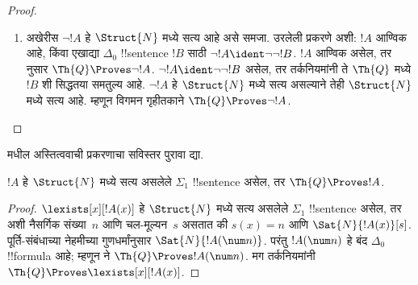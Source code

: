 \documentclass[../../../include/open-logic-section]{subfiles}
\begin{document}
\begin{proof}
\begin{enumerate}
$\lnot \bexists{x<t}{!A(x)}$ हे
$\Struct{N}$ मध्ये सत्य आहे असे समजा.
हे !!{sentence} $\Th{Q}$ मध्ये
$\bforall{x<t}{\lnot!A(x)}$ शी समतुल्य
आहे; म्हणून परिबद्ध वैश्विक संख्यापकाचा
युक्तिवाद लागू करता येतो.
%
\item अखेरीस $\lnot !A$ हे
$\Struct{N}$ मध्ये सत्य आहे असे समजा.
उरलेली प्रकरणे अशी: $!A$ आण्विक आहे,
किंवा एखाद्या $\Delta_0$ !!{sentence} $!B$
साठी $\lnot !A \ident \lnot\lnot !B$.
$!A$ आण्विक असेल, तर
 नुसार
$\Th{Q} \Proves \lnot !A$.
$\lnot !A \ident \lnot\lnot !B$ असेल,
तर तर्कनियमांनी ते $\Th{Q}$ मध्ये
$!B$ शी सिद्धतया समतुल्य आहे.
$\lnot !A$ हे $\Struct{N}$ मध्ये सत्य
असल्याने तेही $\Struct{N}$ मध्ये सत्य आहे.
म्हणून विगमन गृहीतकाने
$\Th{Q} \Proves \lnot !A$.
\end{enumerate}
\end{proof}

\begin{prob}
 मधील
अस्तित्ववाची प्रकरणाचा सविस्तर पुरावा द्या.
\end{prob}

\begin{thm}
$!A$ हे $\Struct{N}$ मध्ये सत्य असलेले
$\Sigma_1$ !!{sentence} असेल, तर
$\Th{Q} \Proves !A$.
\end{thm}

\begin{proof}
$\lexists[x][!A(x)]$ हे $\Struct{N}$ मध्ये
सत्य असलेले $\Sigma_1$ !!{sentence} असेल,
तर अशी नैसर्गिक संख्या~$n$ आणि चल-मूल्यन~$s$
असतात की $s(x) = n$ आणि
$\Sat{N}{!A(x)}[s]$.
पूर्ति-संबंधाच्या नेहमीच्या गुणधर्मांनुसार
$\Sat{N}{!A(\num n)}$.
परंतु $!A(\num n)$ हे बंद $\Delta_0$ !!{formula}
आहे; म्हणून  ने
$\Th{Q} \Proves !A(\num n)$.
मग तर्कनियमांनी
$\Th{Q} \Proves \lexists[x][!A(x)]$.
\end{proof}
\end{document}
